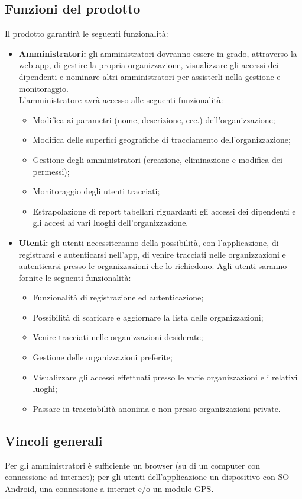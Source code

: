 \subsection{Funzioni del prodotto}
Il prodotto garantirà le seguenti funzionalità:
\begin{itemize}
    \item \textbf{Amministratori:} gli amministratori dovranno essere in grado, attraverso la web app, di gestire la propria organizzazione, visualizzare gli accessi dei dipendenti e nominare altri amministratori per assisterli nella gestione e monitoraggio. \\
        L'amministratore avrà accesso alle seguenti funzionalità:
        \begin{itemize}
            \item Modifica ai parametri (nome, descrizione, ecc.) dell'organizzazione;
            \item Modifica delle superfici geografiche di tracciamento dell'organizzazione;
            \item Gestione degli amministratori (creazione, eliminazione e modifica dei permessi);
            \item Monitoraggio degli utenti tracciati;
            \item Estrapolazione di report tabellari riguardanti gli accessi dei dipendenti e gli accesi ai vari luoghi dell'organizzazione.
        \end{itemize}
    \item \textbf{Utenti:} gli utenti necessiteranno della possibilità, con l'applicazione, di registrarsi e autenticarsi nell'app, di venire tracciati nelle organizzazioni e autenticarsi presso le organizzazioni che lo richiedono. Agli utenti saranno fornite le seguenti funzionalità:
    \begin{itemize}
        \item Funzionalità di registrazione ed autenticazione;
        \item Possibilità di scaricare e aggiornare la lista delle organizzazioni;
        \item Venire tracciati nelle organizzazioni desiderate;
        \item Gestione delle organizzazioni preferite;
        \item Visualizzare gli accessi effettuati presso le varie organizzazioni e i relativi luoghi;
        \item Passare in tracciabilità anonima e non presso organizzazioni private.
    \end{itemize}
\end{itemize}
\subsection{Vincoli generali}
Per gli amministratori è sufficiente un browser (su di un computer con connessione ad internet); per gli utenti dell'applicazione un dispositivo con SO Android, una connessione a internet e/o un modulo GPS.